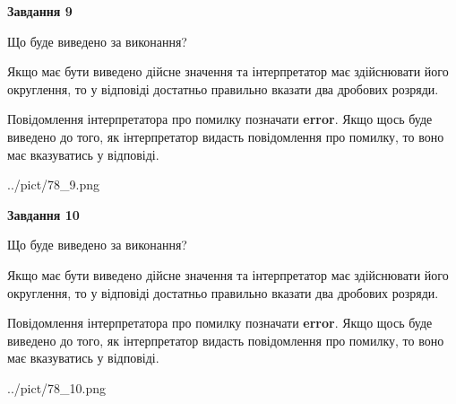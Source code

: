 \documentclass[12pt, ukrainian]{article}
\begin{document}
{\begin {Large}
{\begin {center}\textbf{Завдання 9}\end {center}}\par
Що буде виведено за виконання? \par

Якщо має бути виведено дійсне значення та інтерпретатор має здійснювати його округлення, 
то у відповіді достатньо правильно вказати два дробових розряди.

Повідомлення інтерпретатора про помилку позначати \textbf{error}.
Якщо щось буде виведено до того, як інтерпретатор видасть повідомлення про помилку, 
то воно має вказуватись у відповіді. \par

\begin{center}
	{../pict/78_9.png}
\end{center}
\newpage

{\begin {center}\textbf{Завдання 10}\end {center}}\par
Що буде виведено за виконання? \par

Якщо має бути виведено дійсне значення та інтерпретатор має здійснювати його округлення, 
то у відповіді достатньо правильно вказати два дробових розряди.

Повідомлення інтерпретатора про помилку позначати \textbf{error}.
Якщо щось буде виведено до того, як інтерпретатор видасть повідомлення про помилку, 
то воно має вказуватись у відповіді. \par

\begin{center}
	{../pict/78_10.png}
\end{center}
\newpage

\end {Large}}
\end{document}
